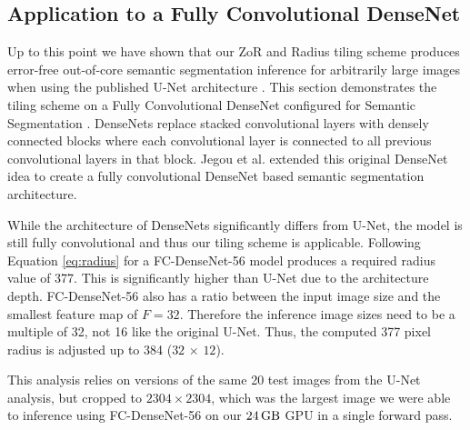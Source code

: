 \documentclass[runningheads]{llncs}
\begin{document}
\subsection{Application to a Fully Convolutional DenseNet}

Up to this point we have shown that our ZoR and Radius tiling scheme produces error-free out-of-core semantic segmentation inference for arbitrarily large images when using the published U-Net architecture \cite{Ronneberger2015a}. 
This section demonstrates the tiling scheme on a Fully Convolutional DenseNet configured for Semantic Segmentation \cite{Jegou2017}. DenseNets \cite{Huang2017} replace stacked convolutional layers with densely connected blocks where each convolutional layer is connected to all previous convolutional layers in that block. Jegou et al. \cite{Jegou2017} extended this original DenseNet idea to create a fully convolutional DenseNet based semantic segmentation architecture. 

While the architecture of DenseNets significantly differs from U-Net, the model is still fully convolutional and thus our tiling scheme is applicable. Following Equation \ref{eq:radius} 
for a FC-DenseNet-56 \cite{Jegou2017} model produces a required radius value of 377. This is significantly higher than U-Net due to the architecture depth. FC-DenseNet-56 also has a ratio between the input image size and the smallest feature map of $F = 32$. Therefore the inference image sizes need to be a multiple of 32, not 16 like the original U-Net. Thus, the computed 377 pixel radius is adjusted up to 384 
($\num{32}$ 
$\times$
$\num{12}$). 

This analysis relies on versions of the same 20 test images from the U-Net analysis, but cropped to $\num{2304} \times \num{2304}$, which was the largest image we were able to inference using FC-DenseNet-56 on our $\SI{24}{\giga\byte}$ GPU in a single forward pass. 
\end{document}
